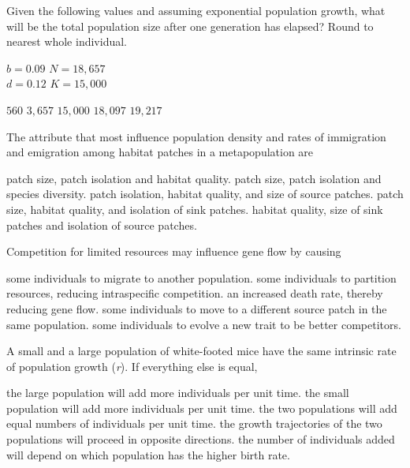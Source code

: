 \question
Given the following values and assuming exponential population growth, what will be the total population size after one generation has elapsed? Round to nearest whole individual.\vspace{1ex}

\hspace{\leftmargin}%
\begin{minipage}{2in}
$b = 0.09$ \qquad $N = 18,657$\\
$d = 0.12$ \qquad $K = 15,000$\\
\end{minipage}

\begin{choices}
\choice $560$ %
\choice $3,657$ %
\choice $15,000$ %
\correctchoice $18,097$ %
\choice $19,217$ %
\end{choices}

\question
The attribute that most influence population density and rates of immigration and emigration among habitat patches in a metapopulation are

\begin{choices}
	\correctchoice patch size, patch isolation and habitat quality. %
	\choice patch size, patch isolation and species diversity. %
	\choice patch isolation, habitat quality, and size of source patches. %
	\choice patch size, habitat quality, and isolation of sink patches. %
	\choice habitat quality, size of sink patches and isolation of source patches. %
\end{choices}

\question
Competition for limited resources may influence gene flow by causing

\begin{choices}
	\correctchoice some individuals to migrate to another population.%
	\choice  some individuals to partition resources, reducing intraspecific competition.%
	\choice  an increased death rate, thereby reducing gene flow.%
	\choice  some individuals to move to a different source patch in the same population.%
	\choice  some individuals to evolve a new trait to be better competitors.%
\end{choices}


\question
A small and a large population of white-footed mice have the same intrinsic rate of population growth (\textit{r}).  If everything else is equal, 

\begin{choices}
	\correctchoice the large population will add more individuals per unit time.  %
	\choice the small population will add more individuals per unit time. %
	\choice the two populations will add equal numbers of individuals per unit time.%
	\choice the growth trajectories of the two populations will proceed in opposite directions. %
	\choice the number of individuals added will depend on which population has the higher birth rate. %
\end{choices}

